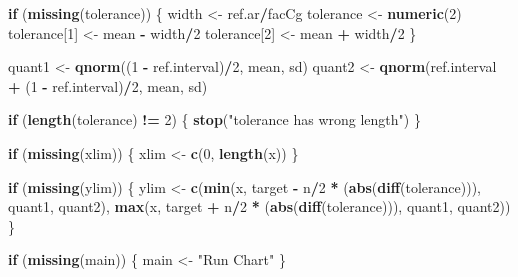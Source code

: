 \documentclass[
]{book}
\newenvironment{Shaded}{\begin{snugshade}}{\end{snugshade}}
\newcommand{\ControlFlowTok}[1]{\textcolor[rgb]{0.13,0.29,0.53}{\textbf{#1}}}
\newcommand{\DecValTok}[1]{\textcolor[rgb]{0.00,0.00,0.81}{#1}}
\newcommand{\FunctionTok}[1]{\textcolor[rgb]{0.13,0.29,0.53}{\textbf{#1}}}
\newcommand{\NormalTok}[1]{#1}
\newcommand{\OtherTok}[1]{\textcolor[rgb]{0.56,0.35,0.01}{#1}}
\newcommand{\SpecialCharTok}[1]{\textcolor[rgb]{0.81,0.36,0.00}{\textbf{#1}}}
\newcommand{\StringTok}[1]{\textcolor[rgb]{0.31,0.60,0.02}{#1}}
\begin{document}
\begin{Shaded}
\begin{Highlighting}[]
  \ControlFlowTok{if}\NormalTok{ (}\FunctionTok{missing}\NormalTok{(tolerance)) \{}
\NormalTok{    width }\OtherTok{\textless{}{-}}\NormalTok{ ref.ar}\SpecialCharTok{/}\NormalTok{facCg}
\NormalTok{    tolerance }\OtherTok{\textless{}{-}} \FunctionTok{numeric}\NormalTok{(}\DecValTok{2}\NormalTok{)}
\NormalTok{    tolerance[}\DecValTok{1}\NormalTok{] }\OtherTok{\textless{}{-}}\NormalTok{ mean }\SpecialCharTok{{-}}\NormalTok{ width}\SpecialCharTok{/}\DecValTok{2}
\NormalTok{    tolerance[}\DecValTok{2}\NormalTok{] }\OtherTok{\textless{}{-}}\NormalTok{ mean }\SpecialCharTok{+}\NormalTok{ width}\SpecialCharTok{/}\DecValTok{2}
\NormalTok{  \}}
  
\NormalTok{  quant1 }\OtherTok{\textless{}{-}} \FunctionTok{qnorm}\NormalTok{((}\DecValTok{1} \SpecialCharTok{{-}}\NormalTok{ ref.interval)}\SpecialCharTok{/}\DecValTok{2}\NormalTok{, mean, sd)}
\NormalTok{  quant2 }\OtherTok{\textless{}{-}} \FunctionTok{qnorm}\NormalTok{(ref.interval }\SpecialCharTok{+}\NormalTok{ (}\DecValTok{1} \SpecialCharTok{{-}}\NormalTok{ ref.interval)}\SpecialCharTok{/}\DecValTok{2}\NormalTok{, mean, sd)}
  
  \ControlFlowTok{if}\NormalTok{ (}\FunctionTok{length}\NormalTok{(tolerance) }\SpecialCharTok{!=} \DecValTok{2}\NormalTok{) \{}
    \FunctionTok{stop}\NormalTok{(}\StringTok{"tolerance has wrong length"}\NormalTok{)}
\NormalTok{  \}}
  
  \ControlFlowTok{if}\NormalTok{ (}\FunctionTok{missing}\NormalTok{(xlim)) \{}
\NormalTok{    xlim }\OtherTok{\textless{}{-}} \FunctionTok{c}\NormalTok{(}\DecValTok{0}\NormalTok{, }\FunctionTok{length}\NormalTok{(x))}
\NormalTok{  \}}
  
  \ControlFlowTok{if}\NormalTok{ (}\FunctionTok{missing}\NormalTok{(ylim)) \{}
\NormalTok{    ylim }\OtherTok{\textless{}{-}} \FunctionTok{c}\NormalTok{(}\FunctionTok{min}\NormalTok{(x, target }\SpecialCharTok{{-}}\NormalTok{ n}\SpecialCharTok{/}\DecValTok{2} \SpecialCharTok{*}\NormalTok{ (}\FunctionTok{abs}\NormalTok{(}\FunctionTok{diff}\NormalTok{(tolerance))), quant1, quant2),}
              \FunctionTok{max}\NormalTok{(x, target }\SpecialCharTok{+}\NormalTok{ n}\SpecialCharTok{/}\DecValTok{2} \SpecialCharTok{*}\NormalTok{ (}\FunctionTok{abs}\NormalTok{(}\FunctionTok{diff}\NormalTok{(tolerance))), quant1, quant2))}
\NormalTok{  \}}
  
  \ControlFlowTok{if}\NormalTok{ (}\FunctionTok{missing}\NormalTok{(main)) \{}
\NormalTok{    main }\OtherTok{\textless{}{-}} \StringTok{"Run Chart"}
\NormalTok{  \}}
  

\end{Highlighting}
\end{Shaded}
\end{document}
